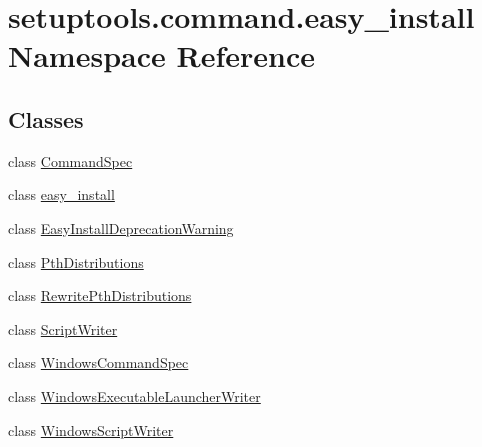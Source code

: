 \hypertarget{namespacesetuptools_1_1command_1_1easy__install}{}\section{setuptools.\+command.\+easy\+\_\+install Namespace Reference}
\label{namespacesetuptools_1_1command_1_1easy__install}
\subsection*{Classes}
\begin{DoxyCompactItemize}
\item 
class \hyperlink{classsetuptools_1_1command_1_1easy__install_1_1CommandSpec}{Command\+Spec}
\item 
class \hyperlink{classsetuptools_1_1command_1_1easy__install_1_1easy__install}{easy\+\_\+install}
\item 
class \hyperlink{classsetuptools_1_1command_1_1easy__install_1_1EasyInstallDeprecationWarning}{Easy\+Install\+Deprecation\+Warning}
\item 
class \hyperlink{classsetuptools_1_1command_1_1easy__install_1_1PthDistributions}{Pth\+Distributions}
\item 
class \hyperlink{classsetuptools_1_1command_1_1easy__install_1_1RewritePthDistributions}{Rewrite\+Pth\+Distributions}
\item 
class \hyperlink{classsetuptools_1_1command_1_1easy__install_1_1ScriptWriter}{Script\+Writer}
\item 
class \hyperlink{classsetuptools_1_1command_1_1easy__install_1_1WindowsCommandSpec}{Windows\+Command\+Spec}
\item 
class \hyperlink{classsetuptools_1_1command_1_1easy__install_1_1WindowsExecutableLauncherWriter}{Windows\+Executable\+Launcher\+Writer}
\item 
class \hyperlink{classsetuptools_1_1command_1_1easy__install_1_1WindowsScriptWriter}{Windows\+Script\+Writer}
\end{DoxyCompactItemize}
